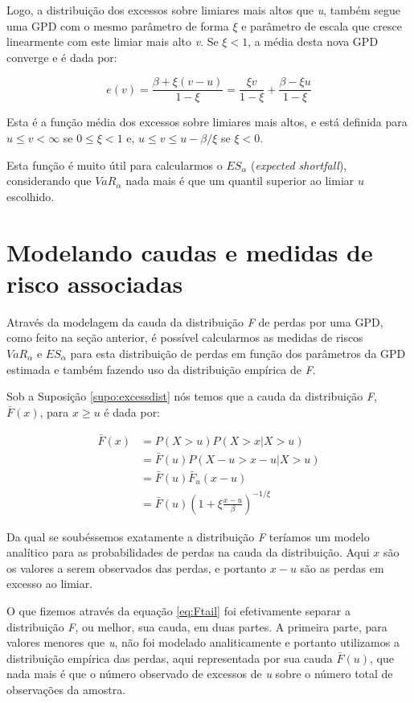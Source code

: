 \documentclass[review]{elsarticle}
\theoremstyle{definition}
\begin{document}
Logo, a distribuição dos excessos sobre limiares mais altos que \emph{u}, também segue uma GPD com o mesmo parâmetro de forma $\xi$ e parâmetro de escala que cresce linearmente com este limiar mais alto \emph{v}. Se $\xi < 1$, a média desta nova GPD converge e é dada por:

\begin{equation}
\label{eq:ev}
e(v)=\frac{\beta+\xi(v-u)}{1-\xi}=\frac{\xi v}{1- \xi}+ \frac{\beta-\xi u}{1-\xi}
\end{equation}

Esta é a função média dos excessos sobre limiares mais altos, e está definida para $u \leq v < \infty$ se $0 \leq \xi < 1$ e, $u \leq v \leq u-\beta / \xi$ se $\xi < 0$.

Esta função é muito útil para calcularmos o $ES_\alpha$ (\emph{expected shortfall}), considerando que $VaR_\alpha$ nada mais é que um quantil superior ao limiar $u$ escolhido.

\section{Modelando caudas e medidas de risco associadas}
\label{sec:caudas}

Através da modelagem da cauda da distribuição \emph{F} de perdas por uma GPD, como feito na seção anterior, é possível calcularmos as medidas de riscos $VaR_\alpha \text{ e } ES_\alpha$ para esta distribuição de perdas em função dos parâmetros da GPD estimada e também fazendo uso da distribuição empírica de \emph{F}.

Sob a Suposição \ref{supo:excessdist} nós temos que a cauda da distribuição \emph{F}, $\bar{F}(x)$, para $x \geq u$ é dada por:

\begin{align}
\label{eq:Ftail}
\bar{F}(x) & = P(X>u)P(X>x|X>u) \nonumber \\
& = \bar{F}(u) P(X-u>x-u|X>u) \nonumber \\
& = \bar{F}(u)\bar{F}_u(x-u) \nonumber \\
& = \bar{F}(u)\left(1+\xi \frac{x-u}{\beta}\right)^{-1/\xi}
\end{align}

Da qual se soubéssemos exatamente a distribuição \emph{F} teríamos um modelo analítico para as probabilidades de perdas na cauda da distribuição. Aqui $x$ são os valores a serem observados das perdas, e portanto $x-u$ são as perdas em excesso ao limiar.

O que fizemos através da equação \eqref{eq:Ftail} foi efetivamente separar a distribuição \emph{F}, ou melhor, sua cauda, em duas partes. A primeira parte, para valores menores que \emph{u}, não foi modelado analiticamente e portanto utilizamos a distribuição empírica das perdas, aqui representada por sua cauda $\bar{F}(u)$, que nada mais é que o número observado de excessos de \emph{u} sobre o número total de observações da amostra.
\end{document}
